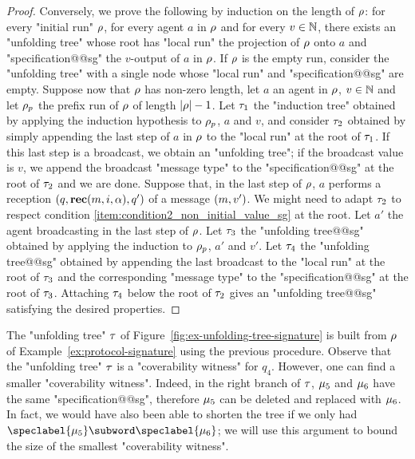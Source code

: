 \begin{proof}
Conversely, we prove the following by induction on the length of $\rho$: for every "initial run" $\rho$, for every agent $a$ in $\rho$ and for every $v \in \mathbb{N}$, there exists an "unfolding tree" whose root has "local run" the projection of $\rho$ onto $a$ and "specification@@sg" the $v$-output of $a$ in $\rho$. If $\rho$ is the empty run, consider the "unfolding tree" with a single node whose "local run" and "specification@@sg" are empty. Suppose now that $\rho$ has non-zero length, let $a$ an agent in $\rho$, $v \in \mathbb{N}$ and let $\rho_p$ the prefix run of $\rho$ of length $|\rho|-1$.
Let $\tau_1$ the "induction tree" obtained by applying the induction hypothesis to $\rho_p$, $a$ and $v$, and consider $\tau_2$ obtained by simply appending the last step of $a$ in $\rho$ to the "local run" at the root of $\tau_1$. If this last step is a broadcast, we obtain an "unfolding tree"; if the broadcast value is $v$, we append the broadcast "message type" to the "specification@@sg" at the root of $\tau_2$ and we are done. 
Suppose that, in the last step of $\rho$, $a$ performs a reception $(q, \textbf{rec}(m, i, \alpha),q')$ of a message $(m,v')$. We might need to adapt $\tau_2$ to respect condition \ref{item:condition2_non_initial_value_sg} at the root. Let $a'$ the agent broadcasting in the last step of $\rho$. Let $\tau_3$ the "unfolding tree@@sg" obtained by applying the induction to $\rho_p$, $a'$ and $v'$. Let $\tau_4$ the "unfolding tree@@sg" obtained by appending the last broadcast to the "local run" at the root of $\tau_3$ and the corresponding "message type" to the "specification@@sg" at the root of $\tau_3$. Attaching $\tau_4$ below the root of $\tau_2$ gives an "unfolding tree@@sg" satisfying the desired properties. 
\end{proof}


	The "unfolding tree" $\tau$ of Figure~\ref{fig:ex-unfolding-tree-signature} is built from $\rho$ of Example~\ref{ex:protocol-signature} using the previous procedure. 
	 Observe that the "unfolding tree" $\tau$  is a "coverability witness" for $q_4$. However, one can find a smaller "coverability witness". 
	Indeed, in the right branch of $\tau$, $\mu_5$ and $\mu_6$ have the same "specification@@sg", therefore $\mu_5$ can be deleted and replaced with $\mu_6$. In fact, we would have also been able to shorten the tree if we only had $\speclabel{\node_5} \subword \speclabel{\node_6}$; we will use this argument to bound the size of the smallest "coverability witness".   

